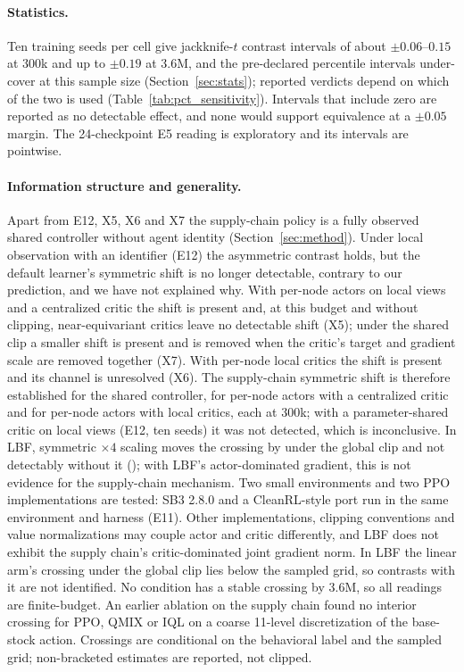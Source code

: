 \paragraph{Statistics.} Ten training seeds per cell give jackknife-$t$ contrast intervals of about $\pm0.06$--$0.15$ at
300k and up to $\pm0.19$ at 3.6M, and the pre-declared percentile intervals under-cover at this sample size
(Section~\ref{sec:stats}); \VpctSensN{} reported verdicts depend on which of the two is used (Table~\ref{tab:pct_sensitivity}).
Intervals that include zero are reported as no detectable effect, and none would support equivalence at a
$\pm0.05$ margin. The 24-checkpoint E5 reading is exploratory and its intervals are pointwise.

\paragraph{Information structure and generality.} Apart from E12, X5, X6 and X7 the supply-chain policy is a fully observed shared
controller without agent identity (Section~\ref{sec:method}). Under local observation with an identifier (E12) the
asymmetric contrast holds, but the default learner's symmetric shift is no longer detectable, contrary to our
prediction, and we have not explained why. With per-node actors on local views and a centralized critic the
shift is present and, at this budget and without clipping, near-equivariant critics leave no detectable shift (X5); under the shared clip a smaller
shift is present and is removed when the critic's target and gradient scale are removed together (X7). With per-node local critics the shift is present and its channel is unresolved (X6). The supply-chain
symmetric shift is therefore established for the shared controller, for per-node actors with a centralized critic and
for per-node actors with local critics, each at 300k; with a parameter-shared critic on local
views (E12, ten seeds) it was not detected, which is inconclusive. In LBF, symmetric $\times4$ scaling moves the crossing by \VfourLBFSymGlobal{} under the global
clip and not detectably without it (\VfourLBFSymSep{}); with LBF's actor-dominated gradient, this is not evidence for the
supply-chain mechanism. Two small environments and two PPO implementations are tested: SB3 2.8.0 and a CleanRL-style port
run in the same environment and harness (E11). Other implementations, clipping conventions and value normalizations
may couple actor and critic differently, and LBF does not exhibit the supply chain's critic-dominated joint gradient norm. In LBF the linear arm's crossing under the global clip lies below the sampled
grid, so contrasts with it are not identified. No condition has a stable crossing by 3.6M, so all readings are
finite-budget. An earlier ablation on the supply chain found no interior crossing for PPO, QMIX or IQL on a
coarse 11-level discretization of the base-stock action. Crossings are conditional on the behavioral label and
the sampled grid; non-bracketed estimates are reported, not clipped.

